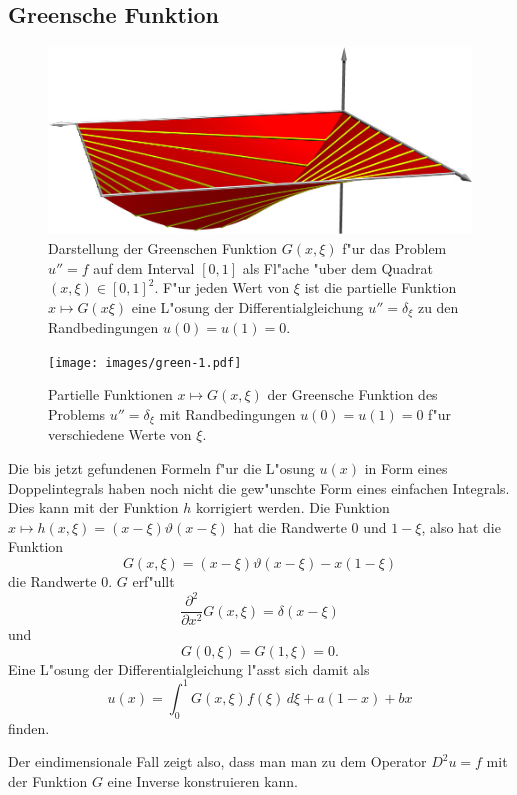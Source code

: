 \subsection{Greensche Funktion}
\begin{figure}
\begin{center}
\includegraphics[width=\hsize]{3d/green.jpg}
\end{center}
\caption{Darstellung der Greenschen Funktion $G(x,\xi)$
f"ur das Problem $u''=f$ auf
dem Interval $[0,1]$ als Fl"ache "uber dem Quadrat $(x,\xi)\in[0,1]^2$.
F"ur jeden Wert von $\xi$ ist die partielle Funktion $x\mapsto G(x\xi)$
eine L"osung der Differentialgleichung $u''=\delta_\xi$ zu den Randbedingungen
$u(0)=u(1)=0$.
\label{elliptisch:green3dflaeche}}
\end{figure}
\begin{figure}
\begin{center}
\texttt{[image: images/green-1.pdf]}
\end{center}
\caption{Partielle Funktionen $x\mapsto G(x,\xi)$ der Greensche Funktion
des Problems $u''=\delta_\xi$ mit Randbedingungen $u(0)=u(1)=0$ f"ur
verschiedene Werte von $\xi$.
\label{elliptisch:green1schar}}
\end{figure}

Die bis jetzt gefundenen Formeln f"ur die L"osung $u(x)$
in Form eines Doppelintegrals haben noch
nicht die gew"unschte Form eines einfachen Integrals.
Dies kann mit der Funktion $h$ korrigiert werden.
Die Funktion $x\mapsto h(x,\xi)=(x-\xi)\vartheta(x-\xi)$ hat die Randwerte
$0$ und $1-\xi$, also hat die Funktion
\[
G(x,\xi)=(x-\xi)\vartheta(x-\xi)-x(1-\xi)
\]
die Randwerte $0$.
$G$ erf"ullt
\[
\frac{\partial^2}{\partial x^2}G(x,\xi)=\delta(x-\xi)
\]
und
\[
G(0,\xi)=G(1,\xi)=0.
\]
Eine L"osung der Differentialgleichung l"asst sich damit
als 
\[
u(x)=\int_0^1G(x,\xi)f(\xi)\,d\xi+a(1-x)+bx
\]
finden.

Der eindimensionale Fall zeigt also, dass man man zu dem Operator $D^2u=f$
mit der Funktion $G$ eine Inverse konstruieren kann.

